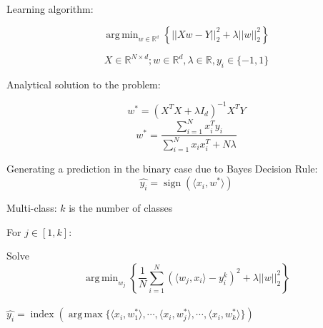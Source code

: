\documentclass[article,12pt]{article}
\DeclareMathOperator*{\argmin}{arg\,min}
\DeclareMathOperator*{\argmax}{arg\,max}
\DeclareMathOperator{\sign}{sign}
\DeclareMathOperator{\ind}{index}
\begin{document}
Learning algorithm:

$$ \argmin_{w \in \mathbb{R^d}} \left\{ ||Xw - Y||_2^2 + \lambda ||w||_2^2 \right\}$$


$$ X \in \mathbb{R}^{N \times d}; w \in \mathbb{R}^d, \lambda \in \mathbb{R}, y_i \in \{-1, 1\}$$

Analytical solution to the problem:

$$ w^* = \left(X^TX + \lambda I_d\right)^{-1} X^T Y$$
$$ w^* = \frac{ \sum_{i=1}^N x_i^{T}y_i}{\sum_{i=1}^N x_ix_i^T + N\lambda}$$

Generating a prediction in the binary case due to Bayes Decision Rule:
$$ \hat{y_i} = \sign(\langle x_i, w^* \rangle)$$


Multi-class: $k$ is the number of classes

For $j \in [1, k]$:

Solve 
$$ \argmin_{w_j} \left\{ \frac{1}{N} \sum_{i=1}^N (\langle w_j, x_i \rangle  - y_i^k)^2 + \lambda || w ||_2^2 \right\}$$\\

$\hat{y_i} = \ind \left(\argmax \{ \langle x_i,w_1^* \rangle, \cdots, \langle x_i,w_j^*\rangle, \cdots, \langle x_i,w_k^*\rangle\}\right)$





\end{document}
